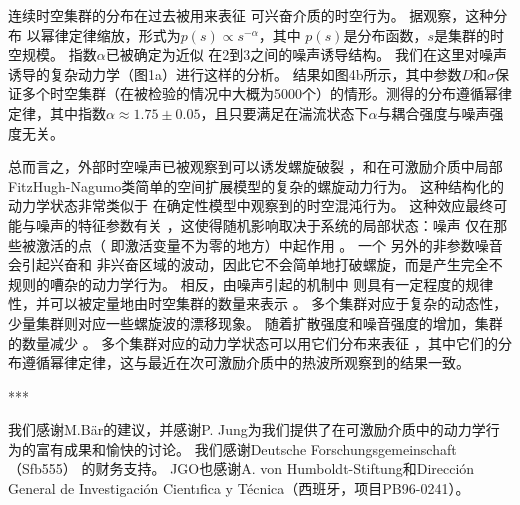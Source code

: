 \documentclass[
pdflinks,
]{xjtuthesis}
\begin{document}
\medskip
连续时空集群的分布在过去被⽤来表征
可兴奋介质的时空⾏为。 据观察，这种分布
以幂律定律缩放，形式为$p(s)\propto s^{-\alpha}$，其中 $p(s)$是分布函数，$s$是集群的时空规模。 指数$\alpha$已被确定为近似
在2到3之间的噪声诱导结构。 我们在这⾥对噪声诱导的复杂动⼒学（图1a）进⾏这样的分析。 结果如图4b所⽰，其中参数$D$和$\sigma$保证多个时空集群（在被检验的情况中大概为5000个）的情形。测得的分布遵循幂律定律，其中指数$\alpha \approx 1.75\pm 0.05$，且只要满足在湍流状态下$\alpha$与耦合强度与噪声强度无关。

\medskip
总而言之，外部时空噪声已被观察到可以诱发螺旋破裂
，和在可激励介质中局部FitzHugh-Nagumo类简单的空间扩展模型的复杂的螺旋动⼒行为。 这种结构化的动⼒学状态⾮常类似于
在确定性模型中观察到的时空混沌⾏为。 这种效应最终可能与噪声的特征参数有关
，这使得随机影响取决于系统的局部状态：噪声
仅在那些被激活的点（ 即激活变量不为零的地⽅）中起作⽤ 。 ⼀个
另外的⾮参数噪⾳会引起兴奋和
⾮兴奋区域的波动，因此它不会简单地打破螺旋，⽽是产⽣完全不规则的嘈杂的动力学行为。 相反，由噪声引起的机制中
则具有⼀定程度的规律性，并可以被定量地由时空集群的数量来表示
。 多个集群对应于复杂的动态性，少量集群则对应一些螺旋波的漂移现象。 
随着扩散强度和噪⾳强度的增加，集群的数量减少
。 多个集群对应的动力学状态可以⽤它们分布来表征
，其中它们的分布遵循幂律定律，这与最近在次可激励介质中的热波所观察到的结果⼀致。

\bigskip
\begin{center}
***
\end{center}

我们感谢M.Bär的建议，并感谢P. Jung为我们提供了在可激励介质中的动力学行为的富有成果和愉快的讨论。 我们感谢Deutsche Forschungsgemeinschaft（Sfb555）
的财务⽀持。 JGO也感谢A. von Humboldt-Stiftung和Dirección
General de Investigación Cientıfica y Técnica（西班⽛，项⽬PB96-0241）。

\xjtuendappendix

\xjtuacknowledgement
\end{document}
